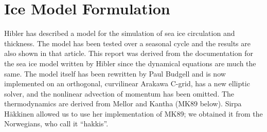 \section{Ice Model Formulation}
\label{Iphys}

Hibler \cite{Hibler79} has described a model for the simulation of sea
ice circulation and thickness.  The model has been tested over a
seasonal cycle and the results are also shown in that article.  This
report was derived from the documentation for the sea ice model written
by Hibler \cite{HiblerDoc} since the dynamical equations are much the
same.  The model itself has been rewritten by Paul Budgell and is now
implemented on an orthogonal, curvilinear Arakawa C-grid, has a new
elliptic solver, and the nonlinear advection of momentum has been
omitted.  The thermodynamics are derived from Mellor and Kantha
\cite{Mellor89} (MK89 below). Sirpa H\"akkinen allowed us to use her
implementation of MK89; we obtained it from the Norwegians, who call it
``hakkis''.

